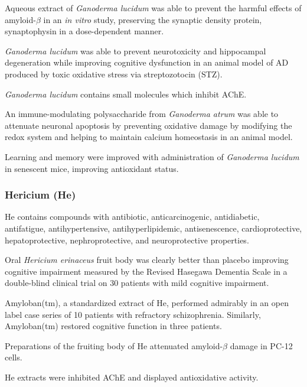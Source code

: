 \documentclass[twocolumn]{article}
\begin{document}
Aqueous extract of \textit{Ganoderma lucidum}
was able to prevent the harmful effects of
amyloid-$\beta$ in an \textit{in vitro} study,
preserving the synaptic density protein, synaptophysin
in a dose-dependent manner.
\cite{lai2008antagonizing}

\textit{Ganoderma lucidum} was able to prevent neurotoxicity and
hippocampal degeneration while improving cognitive dysfunction in an animal model
of AD produced by toxic oxidative stress via streptozotocin (STZ).
\cite{zhou2012neuroprotective}

\textit{Ganoderma lucidum} contains small molecules which inhibit AChE.
\cite{lee2011selective}

An immune-modulating polysaccharide from \textit{Ganoderma atrum}
was able to attenuate neuronal apoptosis
by preventing oxidative damage by modifying the
redox system and helping to maintain calcium homeostasis
in an animal model.
\cite{li2011ganoderma}

Learning and memory were improved with
administration of \textit{Ganoderma lucidum}
in senescent mice,
improving antioxidant status.
\cite{wang2004effects}


\subsubsection{Hericium (He)}

He contains compounds with
antibiotic, anticarcinogenic, antidiabetic, antifatigue,
antihypertensive, antihyperlipidemic, antisenescence,
cardioprotective, hepatoprotective, nephroprotective,
and neuroprotective properties.
\cite{friedman2015chemistry}

Oral \textit{Hericium erinaceus} fruit body
was clearly better than placebo
improving cognitive impairment
measured by the Revised Hasegawa Dementia Scale
in a double-blind clinical trial on 30 patients
with mild cognitive impairment.
\cite{mori2009improving}

Amyloban(tm), a standardized extract of He,
performed admirably in an open label case series
of 10 patients with refractory schizophrenia.
\cite{inanaga2014improvement}
Similarly, Amyloban(tm) restored cognitive function
in three patients.
\cite{inanaga2015treatment}

Preparations of the fruiting body of He
attenuated amyloid-$\beta$ damage in PC-12 cells.
\cite{liu2015systemic}


He extracts were inhibited AChE and displayed antioxidative activity.
\cite{jung2007ache}
\end{document}
